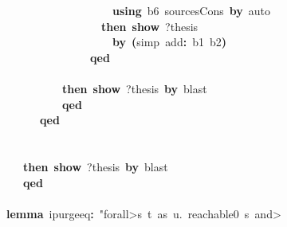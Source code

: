 \documentclass{article}
\newcommand{\syntaxKEYWORDA}[1]{\textcolor[rgb]{0.0,0.4,0.6}{\textbf{#1}}}
\newcommand{\syntaxKEYWORDC}[1]{\textcolor[rgb]{0.0,0.6,1.0}{\textbf{#1}}}
\newcommand{\syntaxLITERALA}[1]{\textcolor[rgb]{1.0,0.0,0.8}{#1}}
\newcommand{\syntaxOPERATOR}[1]{\textcolor[rgb]{0.0,0.0,0.0}{\textbf{#1}}}
\newcommand{\syntaxKEYWORDA}[1]{\textcolor[rgb]{0.0,0.4,0.6}{\textbf{#1}}}
\newcommand{\syntaxKEYWORDC}[1]{\textcolor[rgb]{0.0,0.6,1.0}{\textbf{#1}}}
\newcommand{\syntaxLITERALA}[1]{\textcolor[rgb]{1.0,0.0,0.8}{#1}}
\newcommand{\syntaxOPERATOR}[1]{\textcolor[rgb]{0.0,0.0,0.0}{\textbf{#1}}}
\newcommand{\syntaxKEYWORDA}[1]{\textcolor[rgb]{0.0,0.4,0.6}{\textbf{#1}}}
\newcommand{\syntaxKEYWORDC}[1]{\textcolor[rgb]{0.0,0.6,1.0}{\textbf{#1}}}
\newcommand{\syntaxLITERALA}[1]{\textcolor[rgb]{1.0,0.0,0.8}{#1}}
\newcommand{\syntaxOPERATOR}[1]{\textcolor[rgb]{0.0,0.0,0.0}{\textbf{#1}}}
\newcommand{\syntaxKEYWORDA}[1]{\textcolor[rgb]{0.0,0.4,0.6}{#1}}
\newcommand{\syntaxKEYWORDC}[1]{\textcolor[rgb]{0.0,0.6,1.0}{#1}}
\newcommand{\syntaxLITERALA}[1]{\textcolor[rgb]{1.0,0.0,0.8}{\textbf{#1}}}
\newcommand{\syntaxOPERATOR}[1]{\textcolor[rgb]{0.0,0.0,0.0}{#1}}
\newcommand{\syntaxKEYWORDA}[1]{\textcolor[rgb]{0.0,0.4,0.6}{\textbf{#1}}}
\newcommand{\syntaxKEYWORDC}[1]{\textcolor[rgb]{0.0,0.6,1.0}{\textbf{#1}}}
\newcommand{\syntaxLITERALA}[1]{\textcolor[rgb]{1.0,0.0,0.8}{#1}}
\newcommand{\syntaxOPERATOR}[1]{\textcolor[rgb]{0.0,0.0,0.0}{\textbf{#1}}}
\newcommand{\syntaxKEYWORDA}[1]{\textcolor[rgb]{0.0,0.4,0.6}{\textbf{#1}}}
\newcommand{\syntaxKEYWORDC}[1]{\textcolor[rgb]{0.0,0.6,1.0}{\textbf{#1}}}
\newcommand{\syntaxLITERALA}[1]{\textcolor[rgb]{1.0,0.0,0.8}{#1}}
\newcommand{\syntaxOPERATOR}[1]{\textcolor[rgb]{0.0,0.0,0.0}{\textbf{#1}}}
\begin{document}
{\ }{\ }{\ }{\ }{\ }{\ }{\ }{\ }{\ }{\ }{\ }{\ }{\ }{\ }{\ }{\ }{\ }{\ }{\ }{\ }{\ }{\ }{\ }\syntaxKEYWORDA{using}{\ }b6{\ }sources\usebox{\underscorebox}Cons{\ }\syntaxKEYWORDA{by}{\ }auto\hspace*{\fill}\\
{\ }{\ }{\ }{\ }{\ }{\ }{\ }{\ }{\ }{\ }{\ }{\ }{\ }{\ }{\ }{\ }{\ }{\ }{\ }{\ }{\ }\syntaxKEYWORDA{then}{\ }\syntaxKEYWORDC{show}{\ }?thesis\hspace*{\fill}\\
{\ }{\ }{\ }{\ }{\ }{\ }{\ }{\ }{\ }{\ }{\ }{\ }{\ }{\ }{\ }{\ }{\ }{\ }{\ }{\ }{\ }{\ }{\ }\syntaxKEYWORDA{by}{\ }\syntaxOPERATOR{(}simp{\ }add\syntaxOPERATOR{:}{\ }b1{\ }b2\syntaxOPERATOR{)}\hspace*{\fill}\\
{\ }{\ }{\ }{\ }{\ }{\ }{\ }{\ }{\ }{\ }{\ }{\ }{\ }{\ }{\ }{\ }{\ }{\ }{\ }\syntaxKEYWORDA{qed}\hspace*{\fill}\\
{\ }{\ }{\ }{\ }{\ }{\ }{\ }{\ }{\ }{\ }{\ }{\ }{\ }{\ }\syntaxKEYWORDA{\usebox{\closecurlybracket}}\hspace*{\fill}\\
{\ }{\ }{\ }{\ }{\ }{\ }{\ }{\ }{\ }{\ }{\ }{\ }{\ }{\ }\syntaxKEYWORDA{then}{\ }\syntaxKEYWORDC{show}{\ }?thesis{\ }\syntaxKEYWORDA{by}{\ }blast\hspace*{\fill}\\
{\ }{\ }{\ }{\ }{\ }{\ }{\ }{\ }{\ }{\ }{\ }{\ }{\ }{\ }\syntaxKEYWORDA{qed}\hspace*{\fill}\\
{\ }{\ }{\ }{\ }{\ }{\ }{\ }{\ }{\ }{\ }\syntaxKEYWORDA{qed}\hspace*{\fill}\\
\hspace*{\fill}\\
{\ }{\ }{\ }{\ }{\ }{\ }{\ }\syntaxKEYWORDA{\usebox{\closecurlybracket}}\hspace*{\fill}\\
{\ }{\ }{\ }{\ }{\ }{\ }{\ }\syntaxKEYWORDA{then}{\ }\syntaxKEYWORDC{show}{\ }?thesis{\ }\syntaxKEYWORDA{by}{\ }blast\hspace*{\fill}\\
{\ }{\ }{\ }{\ }{\ }{\ }{\ }\syntaxKEYWORDA{qed}\hspace*{\fill}\\
\hspace*{\fill}\\
{\ }{\ }{\ }{\ }\syntaxKEYWORDA{lemma}{\ }ipurge\usebox{\underscorebox}eq\syntaxOPERATOR{:}{\ }\syntaxLITERALA{"\<forall>s{\ }t{\ }as{\ }u.{\ }reachable0{\ }s{\ }\<and>}\hspace*{\fill}\\
\end{document}
